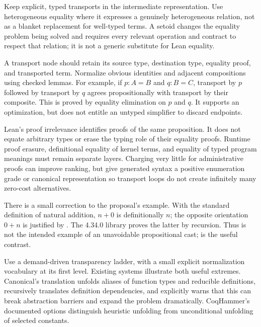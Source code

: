 
\answer Keep explicit, typed transports in the intermediate representation. Use heterogeneous equality where it expresses a genuinely heterogeneous relation, not as a blanket replacement for well-typed terms. A setoid changes the equality problem being solved and requires every relevant operation and contract to respect that relation; it is not a generic substitute for Lean equality.

A transport node should retain its source type, destination type, equality proof, and transported term. Normalize obvious identities and adjacent compositions using checked lemmas. For example, if $p:A=B$ and $q:B=C$, transport by $p$ followed by transport by $q$ agrees propositionally with transport by their composite. This is proved by equality elimination on $p$ and $q$. It supports an optimization, but does not entitle an untyped simplifier to discard endpoints.

Lean's proof irrelevance identifies proofs of the same proposition. It does not equate arbitrary types or erase the typing role of their equality proofs. Runtime proof erasure, definitional equality of kernel terms, and equality of typed program meanings must remain separate layers. Charging very little for administrative proofs can improve ranking, but give generated syntax a positive enumeration grade or canonical representation so transport loops do not create infinitely many zero-cost alternatives.

There is a small correction to the proposal's example. With the standard definition of natural addition, $n+0$ is definitionally $n$; the opposite orientation $0+n$ is justified by . The 4.34.0 library proves the latter by recursion. Thus  is not the intended example of an unavoidable propositional cast;  is the useful contrast.\cite{leannat}


\answer Use a demand-driven transparency ladder, with a small explicit normalization vocabulary at its first level. Existing systems illustrate both useful extremes. Canonical's translation unfolds aliases of function types and reducible definitions, recursively translates definition dependencies, and explicitly warns that this can break abstraction barriers and expand the problem dramatically. CoqHammer's documented  options distinguish heuristic unfolding from unconditional unfolding of selected constants.\cite{canonical,sauto}

